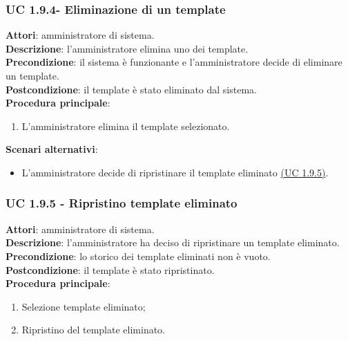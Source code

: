 \subsubsection{UC 1.9.4- Eliminazione di un template}{
	\label{uc1.9.4}
	\textbf{Attori}: amministratore di sistema. \\
	\textbf{Descrizione}: l'amministratore elimina uno dei template. \\
	\textbf{Precondizione}: il sistema è funzionante e l'amministratore decide di eliminare un template.	\\
	\textbf{Postcondizione}: il template è stato eliminato dal sistema.	\\
	\textbf{Procedura principale}:
	\begin{enumerate}
		\item L’amministratore elimina il template selezionato.
	\end{enumerate}
	\textbf{Scenari alternativi}:
	\begin{itemize}
		\item L'amministratore decide di ripristinare il template eliminato \hyperref[uc1.9.5]{(UC 1.9.5)}.
	\end{itemize}
	}
\subsubsection{UC 1.9.5 - Ripristino template eliminato}{
	\label{uc1.9.5}
	\textbf{Attori}: amministratore di sistema. \\
	\textbf{Descrizione}: l'amministratore ha deciso di ripristinare un template eliminato. \\
	\textbf{Precondizione}: lo storico dei template eliminati non è vuoto.	\\
	\textbf{Postcondizione}: il template è stato ripristinato.	\\
	\textbf{Procedura principale}:
	\begin{enumerate}
		\item Selezione template eliminato; 
		\item Ripristino del template eliminato.
	\end{enumerate}
	}

